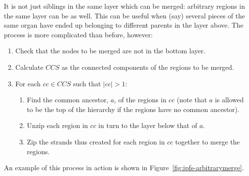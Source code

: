 It is not just siblings in the same layer which can be merged: arbitrary regions in the same layer can be as well. This can be useful when (say) several pieces of the same organ have ended up belonging to different parents in the layer above. The process is more complicated than before, however:

\begin{enumerate}

\item Check that the nodes to be merged are not in the bottom layer.

\item Calculate $\mathit{CCS}$ as the connected components of the regions to be merged.

\item For each $\mathit{cc} \in \mathit{CCS}$ such that $|\mathit{cc}| > 1$:

\begin{enumerate}
\item Find the common ancestor, $a$, of the regions in $\mathit{cc}$ (note that $a$ is allowed to be the top of the hierarchy if the regions have no common ancestor).
\item Unzip each region in $\mathit{cc}$ in turn to the layer below that of $a$.
\item Zip the strands thus created for each region in $\mathit{cc}$ together to merge the regions.
\end{enumerate}

\end{enumerate}

\noindent An example of this process in action is shown in Figure~\ref{fig:ipfs-arbitrarymerge}.

